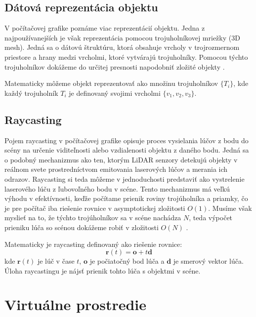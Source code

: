 \subsection{Dátová reprezentácia objektu}

V počítačovej grafike poznáme viac reprezentácií objektu. Jedna z najpoužívanejších je však reprezentácia pomocou trojuholníkovej mriežky (3D mesh). Jedná sa o dátovú štruktúru, ktorá obsahuje vrcholy v trojrozmernom priestore a hrany medzi vrcholmi, ktoré vytvárajú trojuholníky. Pomocou týchto trojuholníkov dokážeme do určitej presnosti napodobniť zložité objekty \cite{computer_graphics}.

Matematicky môžeme objekt reprezentovať ako množinu trojuholníkov $\{T_i\}$, kde každý trojuholník $T_i$ je definovaný svojimi vrcholmi $\{v_1, v_2, v_3\}$.

\subsection{Raycasting}

Pojem raycasting v počítačovej grafike opisuje proces vysielania lúčov z bodu do scény na určenie viditeľnosti alebo vzdialenosti objektu z daného bodu. Jedná sa o podobný mechanizmus ako ten, ktorým LiDAR senzory detekujú objekty v reálnom svete prostredníctvom emitovania laserových lúčov a merania ich odrazov. Raycasting si teda môžeme v jednoduchosti predstaviť ako vystrelenie laserového lúču z ľubovoľného bodu v scéne. Tento mechanizmus má veľkú výhodu v efektívnosti, keďže počítame prienik roviny trojúholníka a priamky, čo je pre počítač iba riešenie rovnice v asymptotickej zložitosti \(O(1)\). Musíme však myslieť na to, že týchto trojúholníkov sa v scéne nachádza \(N\), teda výpočet prieniku lúča so scénou dokážeme robiť v zložitosti \(O(N)\) \cite{computer_graphics}.

Matematicky je raycasting definovaný ako riešenie rovnice:
\[
\mathbf{r}(t) = \mathbf{o} + t\mathbf{d}
\]
kde \(\mathbf{r}(t)\) je lúč v čase \(t\), \(\mathbf{o}\) je počiatočný bod lúča a \(\mathbf{d}\) je smerový vektor lúča. Úloha raycastingu je nájsť prienik tohto lúča s objektmi v scéne.


\section{Virtuálne prostredie}
\label{sec:virtualne_prostredie}

